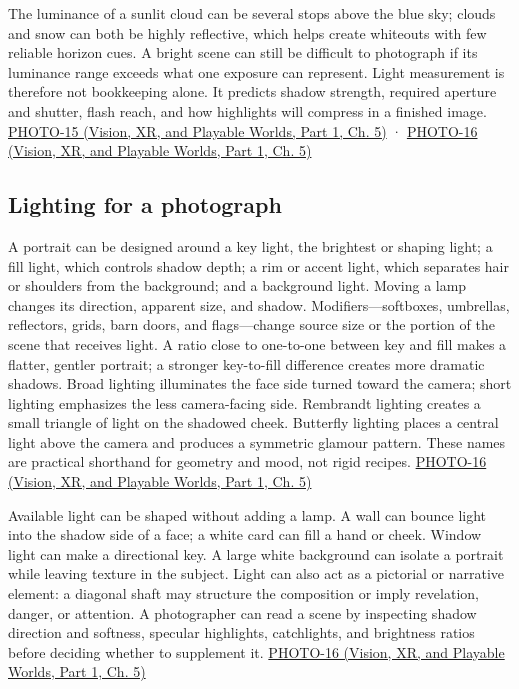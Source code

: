 The luminance of a sunlit cloud can be several stops above the blue sky; clouds and snow can both be highly reflective, which helps create whiteouts with few reliable horizon cues. A bright scene can still be difficult to photograph if its luminance range exceeds what one exposure can represent. Light measurement is therefore not bookkeeping alone. It predicts shadow strength, required aperture and shutter, flash reach, and how highlights will compress in a finished image. \href{../07-Vision-XR-and-Playable-Worlds-P01/main.pdf\#nameddest=04-visual-computing-ii-ch036-photo-15---photography-session-15}{PHOTO-15 (Vision, XR, and Playable Worlds, Part 1, Ch. 5)} · \href{../07-Vision-XR-and-Playable-Worlds-P01/main.pdf\#nameddest=04-visual-computing-ii-ch036-photo-16---photography-session-16}{PHOTO-16 (Vision, XR, and Playable Worlds, Part 1, Ch. 5)}

\subsection{Lighting for a photograph}\label{03-visual-computing-i-ch004-lighting-for-a-photograph}

\hypertarget{03-visual-computing-i-ch004-lighting-for-a-photograph}{}

A portrait can be designed around a key light, the brightest or shaping light; a fill light, which controls shadow depth; a rim or accent light, which separates hair or shoulders from the background; and a background light. Moving a lamp changes its direction, apparent size, and shadow. Modifiers---softboxes, umbrellas, reflectors, grids, barn doors, and flags---change source size or the portion of the scene that receives light. A ratio close to one-to-one between key and fill makes a flatter, gentler portrait; a stronger key-to-fill difference creates more dramatic shadows. Broad lighting illuminates the face side turned toward the camera; short lighting emphasizes the less camera-facing side. Rembrandt lighting creates a small triangle of light on the shadowed cheek. Butterfly lighting places a central light above the camera and produces a symmetric glamour pattern. These names are practical shorthand for geometry and mood, not rigid recipes. \href{../07-Vision-XR-and-Playable-Worlds-P01/main.pdf\#nameddest=04-visual-computing-ii-ch036-photo-16---photography-session-16}{PHOTO-16 (Vision, XR, and Playable Worlds, Part 1, Ch. 5)}

Available light can be shaped without adding a lamp. A wall can bounce light into the shadow side of a face; a white card can fill a hand or cheek. Window light can make a directional key. A large white background can isolate a portrait while leaving texture in the subject. Light can also act as a pictorial or narrative element: a diagonal shaft may structure the composition or imply revelation, danger, or attention. A photographer can read a scene by inspecting shadow direction and softness, specular highlights, catchlights, and brightness ratios before deciding whether to supplement it. \href{../07-Vision-XR-and-Playable-Worlds-P01/main.pdf\#nameddest=04-visual-computing-ii-ch036-photo-16---photography-session-16}{PHOTO-16 (Vision, XR, and Playable Worlds, Part 1, Ch. 5)}


